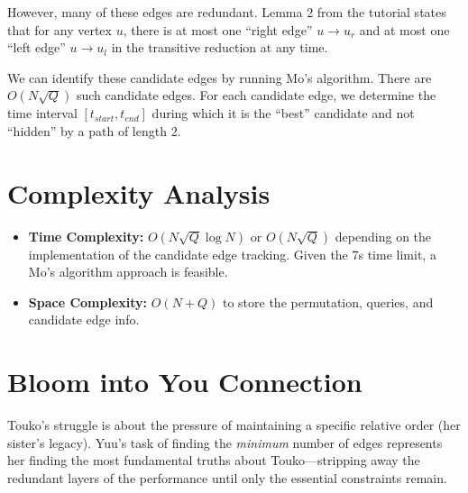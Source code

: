 \documentclass[11pt]{article}
\begin{document}
However, many of these edges are redundant. Lemma 2 from the tutorial states that for any vertex $u$, there is at most one ``right edge'' $u \to u_r$ and at most one ``left edge'' $u \to u_l$ in the transitive reduction at any time.

We can identify these candidate edges by running Mo's algorithm. There are $O(N \sqrt{Q})$ such candidate edges. For each candidate edge, we determine the time interval $[t_{start}, t_{end}]$ during which it is the ``best'' candidate and not ``hidden'' by a path of length 2.

\section*{Complexity Analysis}
\begin{itemize}
    \item \textbf{Time Complexity:} $O(N \sqrt{Q} \log N)$ or $O(N \sqrt{Q})$ depending on the implementation of the candidate edge tracking. Given the 7s time limit, a Mo's algorithm approach is feasible.
    \item \textbf{Space Complexity:} $O(N + Q)$ to store the permutation, queries, and candidate edge info.
\end{itemize}

\section*{Bloom into You Connection}
Touko's struggle is about the pressure of maintaining a specific relative order (her sister's legacy). Yuu's task of finding the \textit{minimum} number of edges represents her finding the most fundamental truths about Touko—stripping away the redundant layers of the performance until only the essential constraints remain.
\end{document}
